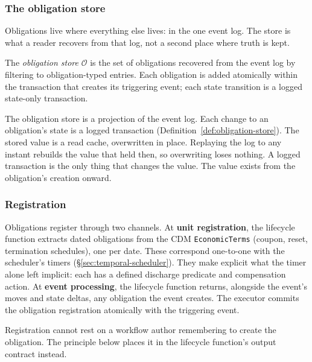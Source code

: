 \subsubsection{The obligation store}
\label{sec:obligation-store}

Obligations live where everything else lives: in the one event log. The store is what a reader recovers from that log, not a second place where truth is kept.

\begin{definition}
\label{def:obligation-store}
The \emph{obligation store} $\mathcal{O}$ is the set of obligations recovered from the event log by filtering to obligation-typed entries. Each obligation is added atomically within the transaction that creates its triggering event; each state transition is a logged state-only transaction.
\end{definition}

\noindent The obligation store is a projection of the event log. Each change to an obligation's state is a logged transaction (Definition~\ref{def:obligation-store}). The stored value is a read cache, overwritten in place. Replaying the log to any instant rebuilds the value that held then, so overwriting loses nothing. A logged transaction is the only thing that changes the value. The value exists from the obligation's creation onward.

\subsubsection{Registration}
\label{sec:obligation-registration}

Obligations register through two channels. At \textbf{unit registration}, the lifecycle function extracts dated obligations from the CDM \texttt{EconomicTerms} (coupon, reset, termination schedules), one per date. These correspond one-to-one with the scheduler's timers (\S\ref{sec:temporal-scheduler}). They make explicit what the timer alone left implicit: each has a defined discharge predicate and compensation action. At \textbf{event processing}, the lifecycle function returns, alongside the event's moves and state deltas, any obligation the event creates. The executor commits the obligation registration atomically with the triggering event.

Registration cannot rest on a workflow author remembering to create the obligation. The principle below places it in the lifecycle function's output contract instead.

